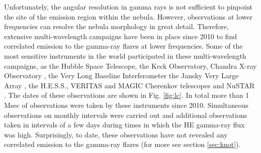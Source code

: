Unfortunately, the angular resolution in gamma rays is not sufficient to pinpoint the site of the emission region within the nebula. However, observations at lower frequencies can resolve the nebula morphology in great detail. Therefore, extensive multi-wavelength campaigns have been in place since 2010 to find correlated emission to the gamma-ray flares at lower frequencies. Some of the most sensitive instruments in the world participated in these multi-wavelength campaigns, as the Hubble Space Telescope, the Keck Observatory, Chandra X-ray Observatory \citep{Weisskopf2013,rudy2015}, the Very Long Baseline Interferometer \citep{Lobanov2011}  the Jansky Very Large Array \citep{Bietenholz2014}, the H.E.S.S., VERITAS and MAGIC Cherenkov telescopes \citep{Abramowski2014,Aliu2014,Aleksic2015} and NuSTAR \citep{Madsen2015}. The dates of these observations are shown in Fig. \ref{fig:lc}. In total more than 1 Msec of observations were taken by these  instruments since 2010. Simultaneous observations on monthly intervals were carried out and additional observations taken in intervals of a few days during times in which the HE gamma-ray flux was high. Surprisingly, to date, these observations have not revealed any correlated emission to the gamma-ray flares (for more see section \ref{sec:knot}). 

